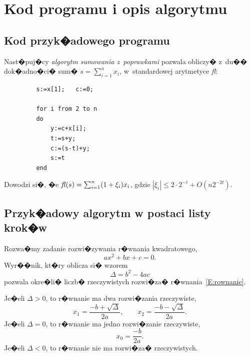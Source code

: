 \documentclass[11pt,wide]{mwart}
\begin{document}
\section{Kod programu i opis algorytmu}

\subsection{Kod przyk�adowego programu}
Nast�puj�cy \textit{algorytm sumowania z~poprawkami} pozwala obliczy�  z~du��
dok�adno�ci� sum� $s=\sum_{i=1}^{n}x_i$, w~standardowej arytmetyce
\textit{fl}:

\begin{verbatim}
         s:=x[1];   c:=0;

         for i from 2 to n
         do
             y:=c+x[i];
             t:=s+y;
             c:=(s-t)+y;
             s:=t
         end
\end{verbatim}

Dowodzi si�, �e $\mbox{\textit{fl}}(s)=\sum_{i=1}^{n}(1+\xi_i)x_i$, gdzie
$|\xi_i|\leq 2\cdot2^{-t}+O(n2^{-2t})$.

\subsection{Przyk�adowy algorytm w postaci listy krok�w}
Rozwa�my zadanie rozwi�zywania r�wnania kwadratowego,
\begin{equation}\label{E:rownanie}
ax^2 + bx + c = 0.
\end{equation}
Wyr��nik, kt�ry oblicza si� wzorem
\begin{equation}\label{E:wyr}
\Delta = b^2 - 4ac
\end{equation}
pozwala okre�li� liczb� rzeczywistych rozwi�za� r�wnania~\eqref{E:rownanie}.

\noindent Je�eli $\Delta > 0$, to r�wnanie ma dwa rozwi�zania rzeczywiste,
\begin{equation}\label{E:rozw1}
x_1 = \frac{-b+\sqrt{\Delta}}{2a}, \qquad x_2 = \frac{-b-\sqrt{\Delta}}{2a}.
\end{equation}
Je�eli $\Delta = 0$, to r�wnanie ma jedno rozwi�zanie rzeczywiste,
\begin{equation}\label{E:rozw2}
x_0 = \frac{-b}{2a}.
\end{equation}
Je�eli $\Delta < 0$, to r�wnanie nie ma rozwi�za� rzeczywistych.
\end{document}
